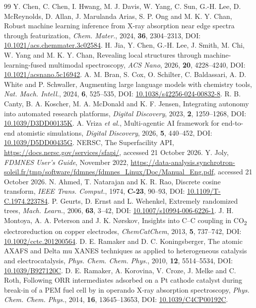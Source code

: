 \begin{thebibliography}{99}
 Y. Chen, C. Chen, I. Hwang, M. J. Davis, W. Yang, C. Sun, G.-H. Lee, D. McReynolds, D. Allan, J. Marulanda Arias, S. P. Ong and M. K. Y. Chan, Robust machine learning inference from X-ray absorption near edge spectra through featurization, \textit{Chem. Mater.}, 2024, \textbf{36}, 2304--2313, DOI: \href{https://doi.org/10.1021/acs.chemmater.3c02584}{10.1021/acs.chemmater.3c02584}.
 H. Jia, Y. Chen, G.-H. Lee, J. Smith, M. Chi, W. Yang and M. K. Y. Chan, Revealing local structures through machine-learning-fused multimodal spectroscopy, \textit{ACS Nano}, 2026, \textbf{20}, 4228--4240, DOI: \href{https://doi.org/10.1021/acsnano.5c16942}{10.1021/acsnano.5c16942}.
 A. M. Bran, S. Cox, O. Schilter, C. Baldassari, A. D. White and P. Schwaller, Augmenting large language models with chemistry tools, \textit{Nat. Mach. Intell.}, 2024, \textbf{6}, 525--535, DOI: \href{https://doi.org/10.1038/s42256-024-00832-8}{10.1038/s42256-024-00832-8}.
 R. B. Canty, B. A. Koscher, M. A. McDonald and K. F. Jensen, Integrating autonomy into automated research platforms, \textit{Digital Discovery}, 2023, \textbf{2}, 1259--1268, DOI: \href{https://doi.org/10.1039/D3DD00135K}{10.1039/D3DD00135K}.
 A. Vriza \textit{et al.}, Multi-agentic AI framework for end-to-end atomistic simulations, \textit{Digital Discovery}, 2026, \textbf{5}, 440--452, DOI: \href{https://doi.org/10.1039/D5DD00435G}{10.1039/D5DD00435G}.
 NERSC, The Superfacility API, \url{https://docs.nersc.gov/services/sfapi/}, accessed 21 October 2026.
 Y. Joly, \textit{FDMNES User's Guide}, November 2022, \url{https://data-analysis.synchrotron-soleil.fr/tmp/software/fdmnes/fdmnes_Linux/Doc/Manual_Eng.pdf}, accessed 21 October 2026.
 N. Ahmed, T. Natarajan and K. R. Rao, Discrete cosine transform, \textit{IEEE Trans. Comput.}, 1974, \textbf{C-23}, 90--93, DOI: \href{https://doi.org/10.1109/T-C.1974.223784}{10.1109/T-C.1974.223784}.
 P. Geurts, D. Ernst and L. Wehenkel, Extremely randomized trees, \textit{Mach. Learn.}, 2006, \textbf{63}, 3--42, DOI: \href{https://doi.org/10.1007/s10994-006-6226-1}{10.1007/s10994-006-6226-1}.
 J. H. Montoya, A. A. Peterson and J. K. N\o rskov, Insights into C--C coupling in CO\textsubscript{2} electroreduction on copper electrodes, \textit{ChemCatChem}, 2013, \textbf{5}, 737--742, DOI: \href{https://doi.org/10.1002/cctc.201200564}{10.1002/cctc.201200564}.
 D. E. Ramaker and D. C. Koningsberger, The atomic AXAFS and Delta mu XANES techniques as applied to heterogeneous catalysis and electrocatalysis, \textit{Phys. Chem. Chem. Phys.}, 2010, \textbf{12}, 5514--5534, DOI: \href{https://doi.org/10.1039/B927120C}{10.1039/B927120C}.
 D. E. Ramaker, A. Korovina, V. Croze, J. Melke and C. Roth, Following ORR intermediates adsorbed on a Pt cathode catalyst during break-in of a PEM fuel cell by in operando X-ray absorption spectroscopy, \textit{Phys. Chem. Chem. Phys.}, 2014, \textbf{16}, 13645--13653, DOI: \href{https://doi.org/10.1039/C4CP00192C}{10.1039/C4CP00192C}.
\end{thebibliography}
